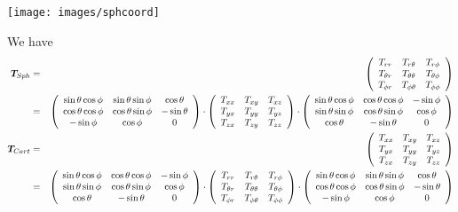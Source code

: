 \begin{center}
\texttt{[image: images/sphcoord]}
\end{center}

We have
\begin{eqnarray}
{\bm T}_{\tiny Sph}&=&
\left(
\begin{array}{ccc}
T_{rr}       & T_{r\theta}      & T_{r\phi} \\
T_{\theta r} & T_{\theta\theta} & T_{\theta\phi} \\
T_{\phi r}   & T_{\phi \theta}  & T_{\phi\phi}
\end{array}
\right) \nonumber\\
&=&
\left(
\begin{array}{ccc}
\sin\theta \cos\phi & \sin\theta \sin\phi & \cos\theta \\
\cos\theta \cos\phi & \cos\theta \sin\phi & -\sin\theta \\
-\sin\phi & \cos\phi & 0 
\end{array}
\right)
\cdot
\left(
\begin{array}{ccc}
T_{xx} & T_{xy} & T_{xz} \\
T_{yx} & T_{yy} & T_{yz} \\
T_{zx} & T_{zy} & T_{zz} 
\end{array}
\right)
\cdot
\left(
\begin{array}{ccc}
\sin\theta\cos\phi & \cos\theta\cos\phi & -\sin\phi \\
\sin\theta\sin\phi & \cos\theta\sin\phi & \cos\phi \\
\cos\theta & -\sin\theta & 0
\end{array}
\right) 
\nonumber\\
{\bm T}_{\tiny Cart} &=&
\left(
\begin{array}{ccc}
T_{xx} & T_{xy} & T_{xz} \\
T_{yx} & T_{yy} & T_{yz} \\
T_{zx} & T_{zy} & T_{zz} 
\end{array}
\right) \nonumber\\
&=&
\left(
\begin{array}{ccc}
\sin\theta\cos\phi & \cos\theta\cos\phi & -\sin\phi \\
\sin\theta\sin\phi & \cos\theta\sin\phi & \cos\phi \\
\cos\theta & -\sin\theta & 0
\end{array}
\right)
\cdot
\left(
\begin{array}{ccc}
T_{rr}       & T_{r\theta}      & T_{r\phi} \\
T_{\theta r} & T_{\theta\theta} & T_{\theta\phi} \\
T_{\phi r}   & T_{\phi \theta}  & T_{\phi\phi}
\end{array}
\right)
\cdot
\left(
\begin{array}{ccc}
\sin\theta \cos\phi & \sin\theta \sin\phi & \cos\theta \\
\cos\theta \cos\phi & \cos\theta \sin\phi & -\sin\theta \\
-\sin\phi & \cos\phi & 0 
\end{array}
\right) \nonumber
\end{eqnarray}
